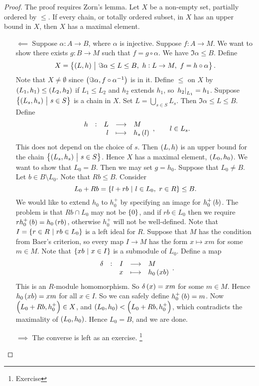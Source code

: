 \begin{proof}
The proof requires Zorn's lemma. Let $ X $ be a non-empty set, partially ordered by $ \le $. If every chain, or totally ordered subset, in $ X $ has an upper bound in $ X $, then $ X $ has a maximal element.
\begin{itemize}
\item[$ \impliedby $] Suppose $ \alpha : A \to B $, where $ \alpha $ is injective. Suppose $ f : A \to M $. We want to show there exists $ g : B \to M $ such that $ f = g \circ \alpha $. We have $ \Im \alpha \le B $. Define
$$ X = \cbr{\br{L, h} \st \Im \alpha \le L \le B, \ h : L \to M, \ f = h \circ \alpha}. $$
Note that $ X \ne \emptyset $ since $ \br{\Im \alpha, f \circ \alpha^{-1}} $ is in it. Define $ \le $ on $ X $ by $ \br{L_1, h_1} \le \br{L_2, h_2} $ if $ L_1 \le L_2 $ and $ h_2 $ extends $ h_1 $, so $ \left. h_2 \right|_{L_1} = h_1 $. Suppose $ \cbr{\br{L_s, h_s} \st s \in S} $ is a chain in $ X $. Set $ L = \bigcup_{s \in S} L_s $. Then $ \Im \alpha \le L \le B $. Define
$$ \function[h]{L}{M}{l}{h_s\br{l}}, \qquad l \in L_s. $$
This does not depend on the choice of $ s $. Then $ \br{L, h} $ is an upper bound for the chain $ \cbr{\br{L_s, h_s} \st s \in S} $. Hence $ X $ has a maximal element, $ \br{L_0, h_0} $. We want to show that $ L_0 = B $. Then we may set $ g = h_0 $. Suppose that $ L_0 \ne B $. Let $ b \in B \setminus L_0 $. Note that $ Rb \le B $. Consider
$$ L_0 + Rb = \cbr{l + rb \st l \in L_0, \ r \in R} \le B. $$
We would like to extend $ h_0 $ to $ h_0^+ $ by specifying an image for $ h_0^+\br{b} $. The problem is that $ Rb \cap L_0 $ may not be $ \cbr{0} $, and if $ rb \in L_0 $ then we require $ rh_0^+\br{b} = h_0\br{rb} $, otherwise $ h_0^+ $ will not be well-defined. Note that $ I = \cbr{r \in R \st rb \in L_0} $ is a left ideal for $ R $. Suppose that $ M $ has the condition from Baer's criterion, so every map $ I \to M $ has the form $ x \mapsto xm $ for some $ m \in M $. Note that $ \cbr{xb \st x \in I} $ is a submodule of $ L_0 $. Define a map
$$ \function[\delta]{I}{M}{x}{h_0\br{xb}}. $$
This is an $ R $-module homomorphism. So $ \delta\br{x} = xm $ for some $ m \in M $. Hence $ h_0\br{xb} = xm $ for all $ x \in I $. So we can safely define $ h_0^+\br{b} = m $. Now $ \br{L_0 + Rb, h_0^+} \in X $, and $ \br{L_0, h_0} < \br{L_0 + Rb, h_0^+} $, which contradicts the maximality of $ \br{L_0, h_0} $. Hence $ L_0 = B $, and we are done.
\item[$ \implies $] The converse is left as an exercise. \footnote{Exercise}
\end{itemize}
\end{proof}


